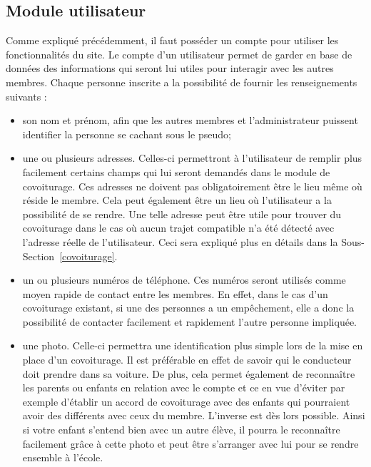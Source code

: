 \documentclass[12pt, a4paper, oneside]{article}
\begin{document}
\subsection{Module utilisateur} \label{utilisateur}
    Comme expliqué précédemment, il faut posséder un compte pour utiliser les fonctionnalités du site. Le compte d'un utilisateur permet de garder en base de données des informations qui seront lui utiles pour interagir avec les autres membres. Chaque personne inscrite a la possibilité de fournir les renseignements suivants :\\
    \begin{itemize}
        \item son nom et prénom, afin que les autres membres et l'administrateur puissent identifier la personne se cachant sous le pseudo;\\
        \item une ou plusieurs adresses. Celles-ci permettront à l'utilisateur de remplir plus facilement certains champs qui lui seront demandés dans le module de covoiturage. Ces adresses ne doivent pas obligatoirement être le lieu même où réside le membre. Cela peut également être un lieu où l'utilisateur a la possibilité de se rendre. Une telle adresse peut être utile pour trouver du covoiturage dans le cas où aucun trajet compatible n'a été détecté avec l'adresse réelle de l'utilisateur. Ceci sera expliqué plus en détails dans la Sous-Section~\ref{covoiturage}.\\
        \item un ou plusieurs numéros de téléphone. Ces numéros seront utilisés comme moyen rapide de contact entre les membres. En effet, dans le cas d'un covoiturage existant, si une des personnes a un empêchement, elle a donc la possibilité de contacter facilement et rapidement l'autre personne impliquée.\\
        \item une photo. Celle-ci permettra une identification plus simple lors de la mise en place d'un covoiturage. Il est préférable en effet de savoir qui le conducteur doit prendre dans sa voiture. De plus, cela permet également de reconnaître les parents ou enfants en relation avec le compte et ce en vue d'éviter par exemple d'établir un accord de covoiturage avec des enfants qui pourraient avoir des différents avec ceux du membre. L'inverse est dès lors possible. Ainsi si votre enfant s'entend bien avec un autre élève, il pourra le reconnaître facilement grâce à cette photo et peut être s'arranger avec lui pour se rendre ensemble à l'école.\\
    \end{itemize}
\end{document}
